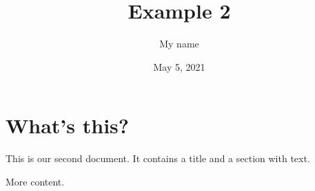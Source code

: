 \documentclass[a4paper,11pt]{article}
\title{Example 2}
\author{My name}
\date{May 5, 2021}
\begin{document}
\maketitle
\section{What's this?}
This is our second document. It contains a title and a section with text.

More content.
\end{document}
